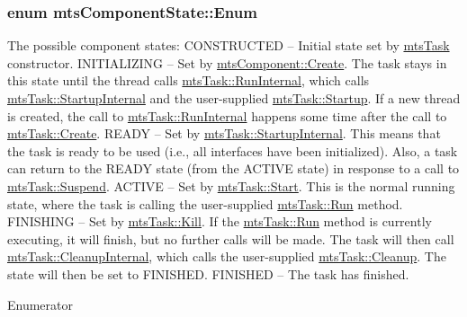\subsubsection[{Enum}]{\setlength{\rightskip}{0pt plus 5cm}enum {\bf mts\+Component\+State\+::\+Enum}}\label{classmts_component_state_a1158e4d2d79fff671354909e87f58928}
The possible component states\+: C\+O\+N\+S\+T\+R\+U\+C\+T\+E\+D -- Initial state set by \hyperlink{classmts_task}{mts\+Task} constructor. I\+N\+I\+T\+I\+A\+L\+I\+Z\+I\+N\+G -- Set by \hyperlink{classmts_component_a7e8a723ce2fa2ed12b2fb4095ca6feec}{mts\+Component\+::\+Create}. The task stays in this state until the thread calls \hyperlink{classmts_task_affcd896841ecfe785f898ef93a4202e9}{mts\+Task\+::\+Run\+Internal}, which calls \hyperlink{classmts_task_a6816f8dfc6124376896318ebcdd4832b}{mts\+Task\+::\+Startup\+Internal} and the user-\/supplied \hyperlink{classmts_component_aaf28f0262b44eb6866e10089a02fa6e4}{mts\+Task\+::\+Startup}. If a new thread is created, the call to \hyperlink{classmts_task_affcd896841ecfe785f898ef93a4202e9}{mts\+Task\+::\+Run\+Internal} happens some time after the call to \hyperlink{classmts_task_aa051581f8b5c35105d595d7a46ccbe17}{mts\+Task\+::\+Create}. R\+E\+A\+D\+Y -- Set by \hyperlink{classmts_task_a6816f8dfc6124376896318ebcdd4832b}{mts\+Task\+::\+Startup\+Internal}. This means that the task is ready to be used (i.\+e., all interfaces have been initialized). Also, a task can return to the R\+E\+A\+D\+Y state (from the A\+C\+T\+I\+V\+E state) in response to a call to \hyperlink{classmts_component_a7264642eb5c56729d1f80263e0e1152b}{mts\+Task\+::\+Suspend}. A\+C\+T\+I\+V\+E -- Set by \hyperlink{classmts_component_abfb4a63739ec45a9cdb91e3363db7c5c}{mts\+Task\+::\+Start}. This is the normal running state, where the task is calling the user-\/supplied \hyperlink{classmts_task_a20e18c9479cb650792456c32ee689834}{mts\+Task\+::\+Run} method. F\+I\+N\+I\+S\+H\+I\+N\+G -- Set by \hyperlink{classmts_task_a67a15d7fffef28708b813e2ea624e4f8}{mts\+Task\+::\+Kill}. If the \hyperlink{classmts_task_a20e18c9479cb650792456c32ee689834}{mts\+Task\+::\+Run} method is currently executing, it will finish, but no further calls will be made. The task will then call \hyperlink{classmts_task_aba518c256e0c623e1e826cc7c76fe8eb}{mts\+Task\+::\+Cleanup\+Internal}, which calls the user-\/supplied \hyperlink{classmts_component_a891f330f4fde7d831dcf7dc537dc5e81}{mts\+Task\+::\+Cleanup}. The state will then be set to F\+I\+N\+I\+S\+H\+E\+D. F\+I\+N\+I\+S\+H\+E\+D -- The task has finished. \begin{Desc}
\item[Enumerator]\par

\end{Desc}
